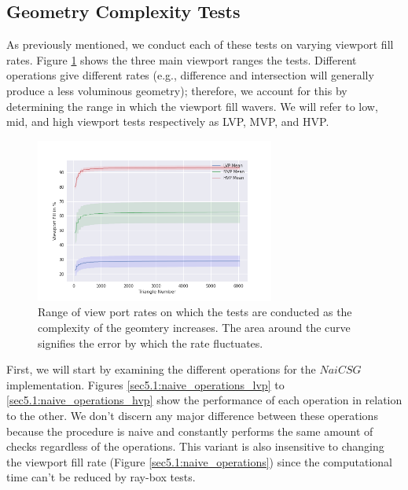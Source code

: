 \documentclass[a4paper,11pt,oneside]{article}
\begin{document}
\subsection{Geometry Complexity Tests}

As previously mentioned, we conduct each of these tests on varying viewport fill rates. Figure \ref{sec5.1:viewport_range} shows the three main viewport ranges the tests. Different operations give different rates (e.g., difference and intersection will generally produce a less voluminous geometry); therefore, we account for this by determining the range in which the viewport fill wavers. We will refer to low, mid, and high viewport tests respectively as LVP, MVP, and HVP.

\begin{figure}[H] 
	\begin{center}
		\includegraphics[width=0.7\textwidth]{section5/plots/view_port_final.png}
	\end{center}
	\caption{Range of view port rates on which the tests are conducted as the complexity of the geomtery increases. The area around the curve signifies the error by which the rate fluctuates.}
	\label{sec5.1:viewport_range}
\end{figure}


First, we will start by examining the different operations for the $NaiCSG$ implementation. Figures \ref{sec5.1:naive_operations_lvp} to \ref{sec5.1:naive_operations_hvp} show the performance of each operation in relation to the other. We don't discern any major difference between these operations because the procedure is naive and constantly performs the same amount of checks regardless of the operations. This variant is also insensitive to changing the viewport fill rate (Figure \ref{sec5.1:naive_operations}) since the computational time can't be reduced by ray-box tests.
\end{document}
